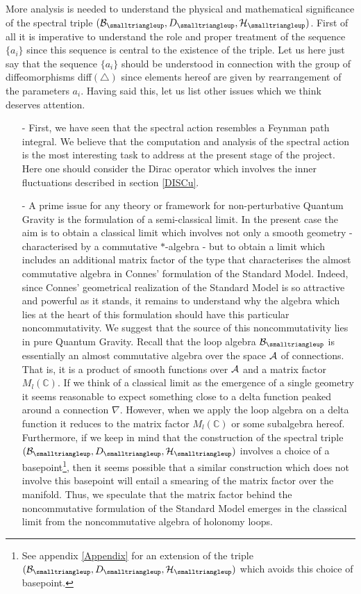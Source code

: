 \documentclass[12pt]{article}
\def\ca{{\cal A}}
\def\cb{{\cal B}}
\def\ch{{\cal H}}
\begin{document}
More analysis is needed to understand the physical and mathematical significance of the spectral triple $(\cb_{\smalltriangleup},D_{\smalltriangleup},\ch_\smalltriangleup)$. First of all it is imperative to understand the role and proper treatment of the sequence $\{a_i\}$ since this sequence is central to the existence of the triple. Let us here just say that the sequence $\{a_i\}$ should be understood in connection with the group of diffeomorphisms diff$(\triangle)$ since elements hereof are given by rearrangement of the parameters $a_i$. Having said this, let us list other issues which we think deserves attention.
\begin{itemize}
\item[-] 
First, we have seen that the spectral action resembles a Feynman path integral. We believe that the computation and analysis of the spectral action is the most interesting task to address at the present stage of the project. Here one should consider the Dirac operator which involves the inner fluctuations described in section \ref{DISCu}.
\item[-] 
A prime issue for any theory or framework for non-perturbative Quantum Gravity is the formulation of a semi-classical limit. In the present case the aim is to obtain a classical limit which involves not only a smooth geometry - characterised by a commutative $\ast$-algebra - but to obtain a limit which includes an additional matrix factor of the type that characterises the almost commutative algebra in Connes' formulation of the Standard Model. Indeed, since Connes' geometrical realization of the Standard Model is so attractive and powerful as it stands, it remains to understand why the algebra which lies at the heart of this formulation should have this particular noncommutativity. We suggest that the source of this noncommutativity lies in pure Quantum Gravity. Recall that the loop algebra $\cb_{\smalltriangleup}$ is essentially an almost commutative algebra over the space $\ca$ of connections. That is, it is a product of smooth functions over $\ca$ and a matrix factor $M_l(\mathbb{C})$. If we think of a classical limit as the emergence of a single geometry it seems reasonable to expect something close to a delta function peaked around a connection $\nabla$. However, when we apply the loop algebra on a delta function it reduces to the matrix factor $M_l(\mathbb{C})$ or some subalgebra hereof. Furthermore, if we keep in mind that the construction of the spectral triple $(\cb_{\smalltriangleup},D_{\smalltriangleup},\ch_\smalltriangleup)$ involves a choice of a basepoint\footnote{See appendix \ref{Appendix} for an extension of the triple $(\cb_{\smalltriangleup},D_{\smalltriangleup},\ch_\smalltriangleup)$ which avoids this choice of basepoint.}, then it seems possible that a similar construction which does not involve this basepoint will entail a smearing of the matrix factor over the manifold.
Thus, we speculate that the matrix factor behind the noncommutative formulation of the Standard Model emerges in the classical limit from the noncommutative algebra of holonomy loops.


\end{itemize}
\end{document}
